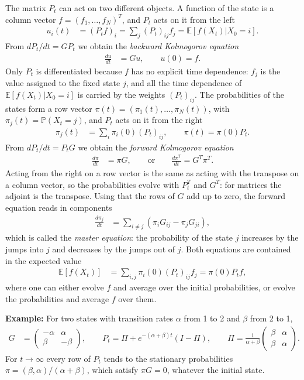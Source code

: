 \documentclass[11pt]{article}
\begin{document}
The matrix $P_t$ can act on two different objects. A function of the state is a column vector $f=(f_1,\dots,f_N)^T$, and $P_t$ acts on it from the left
\begin{align}
  u_i(t)&=(P_tf)_i=\sum_j(P_t)_{ij}f_j=\mathbb{E}[f(X_t)|X_0=i].
\end{align}
From $dP_t/dt=GP_t$ we obtain the {\it backward Kolmogorov equation}
\begin{align}
  \frac{du}{dt}&=Gu,\qquad u(0)=f.
\end{align}
Only $P_t$ is differentiated because $f$ has no explicit time dependence: $f_j$ is the value assigned to the fixed state $j$, and all the time dependence of $\mathbb{E}[f(X_t)|X_0=i]$ is carried by the weights $(P_t)_{ij}$.
The probabilities of the states form a row vector $\pi(t)=(\pi_1(t),\dots,\pi_N(t))$, with $\pi_j(t)=\mathbb{P}(X_t=j)$, and $P_t$ acts on it from the right
\begin{align}
  \pi_j(t)&=\sum_i\pi_i(0)(P_t)_{ij},\qquad\pi(t)=\pi(0)P_t.
\end{align}
From $dP_t/dt=P_tG$ we obtain the {\it forward Kolmogorov equation}
\begin{align}
  \frac{d\pi}{dt}&=\pi G,\qquad\text{or}\qquad\frac{d\pi^T}{dt}=G^T\pi^T.
\end{align}
Acting from the right on a row vector is the same as acting with the transpose on a column vector, so the probabilities evolve with $P_t^T$ and $G^T$: for matrices the adjoint is the transpose. Using that the rows of $G$ add up to zero, the forward equation reads in components
\begin{align}
  \frac{d\pi_j}{dt}&=\sum_{i\neq j}\left(\pi_iG_{ij}-\pi_jG_{ji}\right),
\end{align}
which is called the {\it master equation}: the probability of the state $j$ increases by the jumps into $j$ and decreases by the jumps out of $j$. Both equations are contained in the expected value
\begin{align}
  \mathbb{E}[f(X_t)]&=\sum_{i,j}\pi_i(0)(P_t)_{ij}f_j=\pi(0)P_tf,
\end{align}
where one can either evolve $f$ and average over the initial probabilities, or evolve the probabilities and average $f$ over them.

{\bf Example:} For two states with transition rates $\alpha$ from 1 to 2 and $\beta$ from 2 to 1,
\begin{align}
  G&=\begin{pmatrix}-\alpha&\alpha\\\beta&-\beta\end{pmatrix},\qquad
  P_t=\Pi+e^{-(\alpha+\beta)t}(I-\Pi),\qquad
  \Pi=\frac{1}{\alpha+\beta}\begin{pmatrix}\beta&\alpha\\\beta&\alpha\end{pmatrix}.
\end{align}
For $t\rightarrow\infty$ every row of $P_t$ tends to the stationary probabilities $\pi=(\beta,\alpha)/(\alpha+\beta)$, which satisfy $\pi G=0$, whatever the initial state.
\end{document}
